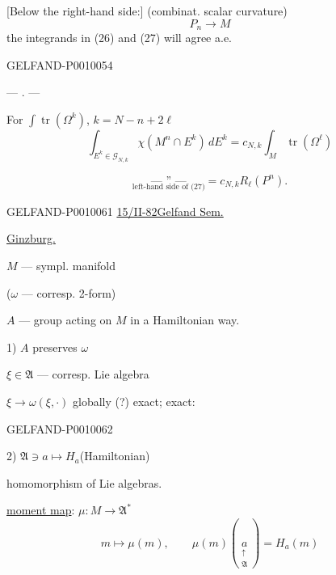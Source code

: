 [Below the right-hand side:] (combinat. scalar curvature)
\[
P_n\longrightarrow M
\]
the integrands in (26) and (27) will agree a.e.

\begin{GelfandAdjacentEvidence}{GELFAND-P001005}{4}
\begin{center}--- . ---\end{center}
For $\displaystyle\int\operatorname{tr}(\Omega^k)$, $k=N-n+2\ell$
\begin{equation*}
\int_{E^k\in\mathcal G_{N,k}}\chi(M^n\cap E^k)\,dE^k
=c_{N,k}\int_M\operatorname{tr}(\Omega^\ell) \tag{28}
\end{equation*}
\end{GelfandAdjacentEvidence}

\begin{equation*}
\underset{\text{left-hand side of (27)}}{\text{--- '' ---}}=c_{N,k}R_\ell(P^n). \tag{29}
\end{equation*}


\begin{GelfandAdjacentEvidence}{GELFAND-P001006}{1}
\underline{15/II-82}\qquad \underline{Gelfand Sem.}

\underline{Ginzburg.}

$M$ --- sympl. manifold

($\omega$ --- corresp. 2-form)

$A$ --- group acting on $M$ in a Hamiltonian way.

1) $A$ preserves $\omega$

$\xi\in\mathfrak A$ --- corresp. Lie algebra

$\xi\longrightarrow\omega(\xi,\cdot)$ globally (?) exact; exact:
\end{GelfandAdjacentEvidence}
\begin{GelfandAdjacentEvidence}{GELFAND-P001006}{2}


2) $\mathfrak A\ni a\longmapsto H_a$\quad (Hamiltonian)

homomorphism of Lie algebras.

\underline{moment map}: $\mu\colon M\longrightarrow\mathfrak A^*$
\[
m\longmapsto\mu(m),\qquad
\mu(m)(\underset{\substack{\uparrow\\\mathfrak A}}{a})=H_a(m)
\]
\end{GelfandAdjacentEvidence}


